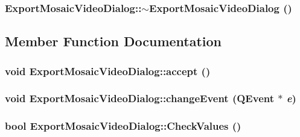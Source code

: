 \hypertarget{class_export_mosaic_video_dialog_0aef55cc90e005b61353bc0aae814a93}{
\subsubsection[{$\sim$ExportMosaicVideoDialog}]{\setlength{\rightskip}{0pt plus 5cm}ExportMosaicVideoDialog::$\sim$ExportMosaicVideoDialog ()}}
\label{class_export_mosaic_video_dialog_0aef55cc90e005b61353bc0aae814a93}




\subsection{Member Function Documentation}
\hypertarget{class_export_mosaic_video_dialog_04899feff2347268ac804db6e4312993}{
\subsubsection[{accept}]{\setlength{\rightskip}{0pt plus 5cm}void ExportMosaicVideoDialog::accept ()}}
\label{class_export_mosaic_video_dialog_04899feff2347268ac804db6e4312993}


\hypertarget{class_export_mosaic_video_dialog_029e7404c6e18cc46238ee2296ea7df1}{
\subsubsection[{changeEvent}]{\setlength{\rightskip}{0pt plus 5cm}void ExportMosaicVideoDialog::changeEvent (QEvent $\ast$ {\em e})}}
\label{class_export_mosaic_video_dialog_029e7404c6e18cc46238ee2296ea7df1}


\hypertarget{class_export_mosaic_video_dialog_a359cf31ad2116e398758c844e64e442}{
\subsubsection[{CheckValues}]{\setlength{\rightskip}{0pt plus 5cm}bool ExportMosaicVideoDialog::CheckValues ()}}
\label{class_export_mosaic_video_dialog_a359cf31ad2116e398758c844e64e442}


